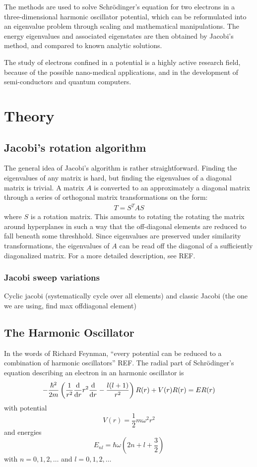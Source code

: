 \documentclass[aps,reprint]{revtex4-1}
\begin{document}
The methods are used to solve Schrödinger's equation for two electrons in a
three-dimensional harmonic oscillator potential, which can be reformulated into
an eigenvalue problem through scaling and mathematical manipulations. The
energy eigenvalues and associated eigenstates are then obtained by Jacobi's method,
and compared to known analytic solutions.

The study of electrons confined in a potential is a highly active research field,
because of the possible nano-medical applications, and in the development of semi-conductors
and quantum computers.
\section{Theory}
\label{sec:theory}
\subsection{Jacobi's rotation algorithm}
The general idea of Jacobi's algorithm is rather straightforward. Finding the
eigenvalues of any matrix is hard, but finding the eigenvalues of a diagonal
matrix is trivial. A matrix \(A\) is converted to an approximately a diagonal
matrix through a series of orthogonal matrix transformations on the form:
\begin{align*}
  T = S^T A S
\end{align*}
where $S$ is a rotation matrix. This amounts to rotating the rotating the matrix
around hyperplanes in such a way that the off-diagonal elements are reduced to
fall beneath some threshhold.
Since eigenvalues are preserved under similarity
transformations, the eigenvalues of \(A\) can be read off the diagonal of a
sufficiently diagonalized matrix. For a more detailed description, see REF.

\subsubsection{Jacobi sweep variations}
Cyclic jacobi (systematically cycle over all elements) and classic Jacobi (the one we are using, find max offdiagonal element)
\subsection{The Harmonic Oscillator}
\label{sec:harmonic}
In the words of Richard Feynman, ``every potential can be reduced to a
combination of harmonic oscillators'' REF. The radial part of Schrödinger's
equation describing an electron in an harmonic oscillator is
\begin{equation}
  \label{eq:schroedinger}
  -\frac{\hbar^{2}}{2m} \left( \frac{1}{r^{2}}\dv{r}r^{2}\dv{r} - \frac{l(l+1)}{r^{2}} \right)R(r) + V(r)R(r) = ER(r)
\end{equation}
with potential
\begin{equation*}
  V(r) = \frac{1}{2}mω^{2}r^{2}
\end{equation*}
and energies
\begin{equation*}
  E_{nl} = \hbar\omega\left( 2n+l+\frac{3}{2} \right)
\end{equation*}
with \(n=0,1,2,\ldots\) and \(l = 0,1,2,\ldots\)
\end{document}
